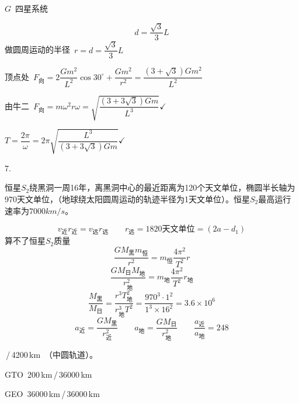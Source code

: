 \begin{problem}
$G$\ 四星系统
\begin{solution}
\[
d=\frac{\sqrt3}{3}L
\]
做圆周运动的半径\ $r=d=\dfrac{\sqrt3}{3}L$

顶点处\ $F_{\text{向}}=2\dfrac{Gm^2}{L^2}\cos30^\circ+\dfrac{Gm^2}{r^2}=\dfrac{(3+\sqrt3)Gm^2}{L^2}$

由牛二\ $F_{\text{向}}=m\omega^2r$\quad $\omega=\sqrt{\dfrac{(3+3\sqrt3)Gm}{L^3}}$\quad $\checkmark$

$T=\dfrac{2\pi}{\omega}=2\pi\sqrt{\dfrac{L^3}{(3+3\sqrt3)Gm}}$\quad $\checkmark$
\end{solution}
\end{problem}
7.
\begin{problem}
恒星$S_2$绕黑洞一周16年，离黑洞中心的最近距离为120个天文单位，椭圆半长轴为970天文单位，（地球绕太阳圆周运动的轨迹半径为1天文单位）。恒星$S_2$最高运行速率为$7000\unit{km/s}$。 %
\begin{solution}
\[
v_{\text{近}}r_{\text{近}}=v_{\text{远}}r_{\text{远}}\qquad r_{\text{远}}=1820\text{天文单位}=(2a-d_1) %
\]
算不了恒星$S_2$质量
\[
\frac{GM_{\text{黑}}m_{\text{恒}}}{r^2}=m_{\text{恒}}\frac{4\pi^2}{T^2}r
\]
\[
\frac{GM_{\text{日}}M_{\text{地}}}{r_{\text{地}}^2}=m_{\text{地}}\frac{4\pi^2}{T^2}r_{\text{地}}
\]
\[
\frac{M_{\text{黑}}}{M_{\text{日}}}=\frac{r^3T_{\text{地}}^2}{r_{\text{地}}^3T^2}=\frac{970^3\cdot1^2}{1^3\times16^2}=3.6\times10^6
\]
\[
a_{\text{近}}=\frac{GM_{\text{黑}}}{r_{\text{近}}^2}\qquad a_{\text{地}}=\frac{GM_{\text{日}}}{r_{\text{地}}^2}\qquad \frac{a_{\text{近}}}{a_{\text{地}}}=248
\]
\end{solution}
\end{problem}

\,/\,4200\,km\ （中圆轨道）。

GTO\ 200\,km\,/\,36000\,km

GEO\ 36000\,km\,/\,36000\,km

